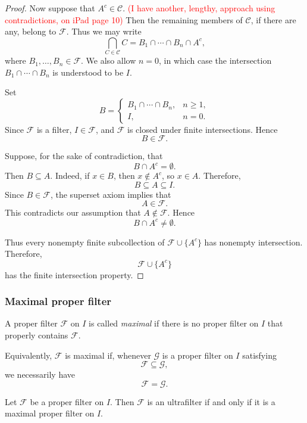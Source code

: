 {\begin{proof}
Now suppose that \(A^c\in\mathcal{C}\). \textcolor{red}{(I have another, lengthy, approach using contradictions, on iPad page 10)} Then the remaining members of
\(\mathcal{C}\), if there are any, belong to \(\mathcal{F}\). Thus we may
write
\[
\bigcap_{C\in\mathcal{C}}C
=
B_1\cap\cdots\cap B_n\cap A^c,
\]
where \(B_1,\ldots,B_n\in\mathcal{F}\). We also allow \(n=0\), in which
case the intersection \(B_1\cap\cdots\cap B_n\) is understood to be \(I\).

Set
\[
B=
\begin{cases}
B_1\cap\cdots\cap B_n, & n\geq 1,\\
I, & n=0.
\end{cases}
\]
Since \(\mathcal{F}\) is a filter, \(I\in\mathcal{F}\), and
\(\mathcal{F}\) is closed under finite intersections. Hence
\[
B\in\mathcal{F}.
\]

Suppose, for the sake of contradiction, that
\[
B\cap A^c=\emptyset.
\]
Then \(B\subseteq A\). Indeed, if \(x\in B\), then \(x\notin A^c\), so
\(x\in A\). Therefore,
\[
B\subseteq A\subseteq I.
\]
Since \(B\in\mathcal{F}\), the superset axiom implies that
\[
A\in\mathcal{F}.
\]
This contradicts our assumption that \(A\notin\mathcal{F}\). Hence
\[
B\cap A^c\neq\emptyset.
\]

Thus every nonempty finite subcollection of
\(\mathcal{F}\cup\{A^c\}\) has nonempty intersection. Therefore,
\[
\mathcal{F}\cup\{A^c\}
\]
has the finite intersection property.
\end{proof}

\subsubsection{Maximal proper filter}

\begin{defn}
A proper filter \(\mathcal{F}\) on \(I\) is called \emph{maximal} if there
is no proper filter on \(I\) that properly contains \(\mathcal{F}\).

Equivalently, \(\mathcal{F}\) is maximal if, whenever \(\mathcal{G}\) is a
proper filter on \(I\) satisfying
\[
\mathcal{F}\subseteq\mathcal{G},
\]
we necessarily have
\[
\mathcal{F}=\mathcal{G}.
\]
\end{defn}

\begin{prop} \label{prop: ultrafilters are maximal proper filters}
Let \(\mathcal{F}\) be a proper filter on \(I\). Then
\(\mathcal{F}\) is an ultrafilter if and only if it is a maximal proper
filter on \(I\).
\end{prop}

}
